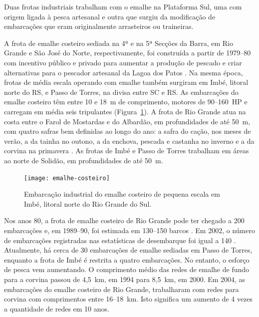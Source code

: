 \documentclass[a4paper,11pt,twoside,showtrims,onecolumn,openright,final]{memoir}
\begin{document}

Duas frotas industriais trabalham com o emalhe na Plataforma Sul, 
uma com origem ligada à pesca artesanal e outra que surgiu
da modificação de embarcações que eram originalmente arrasteiros ou traineiras.

A frota de emalhe costeiro sediada
na 4ª e na 5ª Secções da Barra, em Rio Grande e São José do Norte, respectivamente, 
foi construída a partir de 1979--80 com incentivo público e privado para aumentar 
a produção de pescado e criar alternativas para o pescador artesanal da 
Lagoa dos Patos \citep{silva1990}. Na mesma época, frotas de média escala operando 
com emalhe também surgiram em Imbé, litoral norte do RS, e Passo de Torres, na divisa entre
SC e RS. As embarcações do emalhe costeiro têm entre 10 e 18~m de comprimento,
motores de 90--160~HP e carregam em média seis tripulantes (Figura~\ref{fig:embarcacao-emalhe-costeiro}).
A frota de Rio Grande atua na costa
entre o Farol de Mostardas e do Albardão, em profundidades de até 50~m, com
quatro safras bem definidas ao longo do ano: 
a safra do cação, nos meses de verão, 
a da tainha no outono, a da enchova, pescada e castanha no inverno 
e a da corvina na primavera \citep{BARCELLOS1991}.
As frotas de Imbé e Passo de Torres trabalham em áreas 
ao norte de Solidão, em profundidades de até 50~m.




\begin{figure}
\begin{center}
\texttt{[image: emalhe-costeiro]}
\end{center}
\caption[Embarcação industrial do emalhe costeiro de pequena escala]
        {Embarcação industrial do emalhe costeiro de pequena escala em Imbé, 
         litoral norte do Rio Grande do Sul.}
\label{fig:embarcacao-emalhe-costeiro}
\end{figure}


Nos anos 80, a frota de emalhe costeiro de Rio Grande 
pode ter chegado a 200 embarcações 
e, em 1989--90, foi estimada em 130--150 barcos \citep{BARCELLOS1991}.
Em 2002, o número de embarcações registradas nas estatísticas de
desembarque foi igual a 140 \citep{ceperg2003}. Atualmente, há cerca de 30 embarcações
de emalhe sediadas em Passo de Torres, enquanto a frota de Imbé é restrita
a quatro embarcações.
No entanto, o esforço de pesca vem aumentando. O comprimento 
médio das redes de emalhe de fundo para a corvina passou de 4,5~km, 
em 1994 para 8,5~km, em 2000. Em 2004, as embarcações do emalhe costeiro de Rio Grande,
trabalharam com redes para corvina com comprimentos entre 16--18~km. 
Isto significa um aumento de 4 vezes a quantidade de redes em 10 anos.
\end{document}

